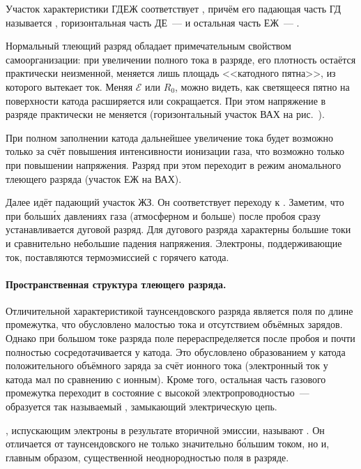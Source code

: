 Участок характеристики ГДЕЖ соответствует ,
причём его падающая часть ГД называется ,
горизонтальная часть ДЕ~---  и
остальная часть ЕЖ~--- .

Нормальный тлеющий разряд обладает примечательным свойством самоорганизации:
при увеличении полного тока в разряде, его плотность остаётся практически
неизменной, меняется лишь площадь <<катодного пятна>>, из которого вытекает ток.
Меняя $\mathcal{E}$ или $R_0$, можно видеть, как светящееся пятно
на поверхности катода расширяется или сокращается.
При этом напряжение в разряде практически не меняется
(горизонтальный участок ВАХ на рис.~).

При полном заполнении катода дальнейшее увеличение тока будет возможно только за
счёт повышения интенсивности ионизации газа, что возможно только при повышении
напряжения. Разряд при этом переходит в режим аномального тлеющего разряда
(участок ЕЖ на ВАХ).

Далее идёт падающий участок ЖЗ. Он соответствует переходу к
. Заметим, что при больш\'{и}х давлениях газа
(атмосферном и больше) после пробоя сразу устанавливается дуговой разряд.
Для дугового разряда характерны большие токи и сравнительно небольшие падения
напряжения. Электроны, поддерживающие ток, поставляются термоэмиссией
с горячего катода.

\paragraph{Пространственная структура тлеющего разряда.}
Отличительной характеристикой таунсендовского разряда
является  поля по длине промежутка, что обусловлено малостью тока
и отсутствием объёмных зарядов. Однако при большом токе разряда поле
перераспределяется после пробоя и почти полностью сосредотачивается у катода.
Это обусловлено образованием у катода положительного объёмного заряда за счёт
ионного тока (электронный ток у катода мал по сравнению с ионным). Кроме того,
остальная часть газового промежутка переходит в состояние с высокой
электропроводностью~--- образуется так называемый
, замыкающий электрическую цепь.

, испускающим электроны
в результате вторичной эмиссии, называют .
Он отличается от таунсендовского не только значительно б\'{о}льшим током,
но и, главным образом, существенной неоднородностью поля в разряде.

